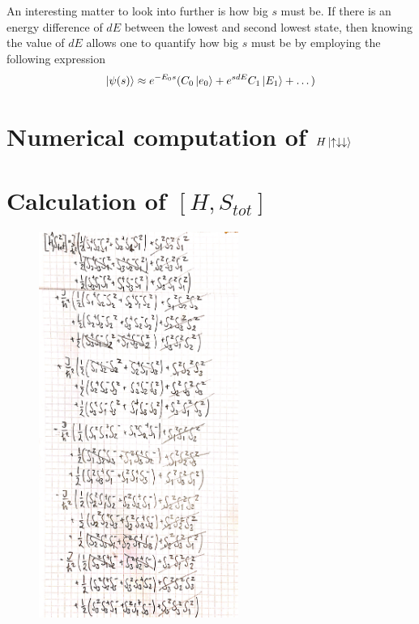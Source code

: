 \documentclass{article}
\begin{document}
An interesting matter to look into further is how big $s$ must be. If there is an energy difference of $dE$ between the lowest and second lowest state, then knowing the value of $dE$ allows one to quantify how big $s$ must be by employing the following expression
\begin{equation*}
\ket{\psi(s)}\approx e^{-E_0s}(C_0\ket{e_0}+e^{sdE}C_1\ket{E_1}+\dots)
\end{equation*}

\pagebreak
\begin{appendix}
\section{Numerical computation of $H\ket{\uparrow\downarrow\downarrow}$}
\label{app:updndn}


\pagebreak
\section{Calculation of $[H,S_{tot}]$}
\label{app:prob1.5}
\begin{figure}[ht]
	\centering
	\includegraphics[width=0.58\textwidth]{figures/Problem1_5_1.jpg}
\end{figure}


\end{appendix}
\end{document}
